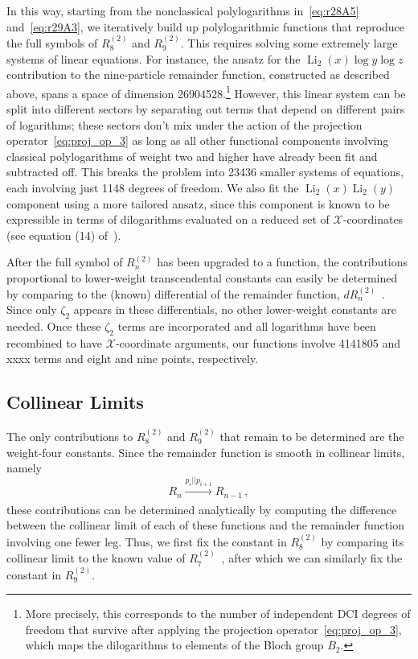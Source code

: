 \documentclass[11pt]{article}
\DeclareMathOperator{\Li}{Li}
\def\x{\mathcal{X}}
\begin{document}
In this way, starting from the nonclassical polylogarithms in~\eqref{eq:r28A5} and~\eqref{eq:r29A3}, we iteratively build up polylogarithmic functions that reproduce the full symbols of $R_8^{(2)}$\! and $R_9^{(2)}$\!. This requires solving some extremely large systems of linear equations. For instance, the ansatz for the $\Li_2(x) \log y  \log z$ contribution to the nine-particle remainder function, constructed as described above, spans a space of dimension 26904528.\footnote{More precisely, this corresponds to the number of independent DCI degrees of freedom that survive after applying the projection operator~\eqref{eq:proj_op_3}, which maps the dilogarithms to elements of the Bloch group $B_2$.} However, this linear system can be split into different sectors by separating out terms that depend on different pairs of logarithms; these sectors don't mix under the action of the projection operator~\eqref{eq:proj_op_3} as long as all other functional components involving classical polylogarithms of weight two and higher have already been fit and subtracted off. This breaks the problem into 23436 smaller systems of equations, each involving just 1148 degrees of freedom. We also fit the $\Li_2(x) \Li_2(y)$ component using a more tailored ansatz, since this component is known to be expressible in terms of dilogarithms evaluated on a reduced set of $\x$-coordinates (see equation (14) of~\cite{Golden:2014pua}).

After the full symbol of $R_n^{(2)}$\! has been upgraded to a function, the contributions proportional to lower-weight transcendental constants can easily be determined by comparing to the (known) differential of the remainder function, $dR_n^{(2)}$\!~\cite{CaronHuot:2011ky,Golden:2013lha}. Since only $\zeta_2$ appears in these differentials, no other lower-weight constants are needed. Once these $\zeta_2$ terms are incorporated and all logarithms have been recombined to have $\x$-coordinate arguments, our functions involve 4141805 and {\color{red} xxxx} terms and eight and nine points, respectively.

\subsection{Collinear Limits}
\label{sec:collinear_limits}

The only contributions to $R_8^{(2)}$\! and $R_9^{(2)}$\! that remain to be determined are the weight-four constants. Since the remainder function is smooth in collinear limits, namely
\begin{equation} \label{eq:remainder_smooth_collinear_limits}
R_n \xrightarrow[]{p_i || p_{i+1}} R_{n-1} \, ,
\end{equation} 
these contributions can be determined analytically by computing the difference between the collinear limit of each of these functions and the remainder function involving one fewer leg. Thus, we first fix the constant in $R_8^{(2)}$\! by comparing its collinear limit to the known value of $R_7^{(2)}$\!~\cite{Golden:2014xqf}, after which we can similarly fix the constant in $R_9^{(2)}$\!. 
\end{document}
